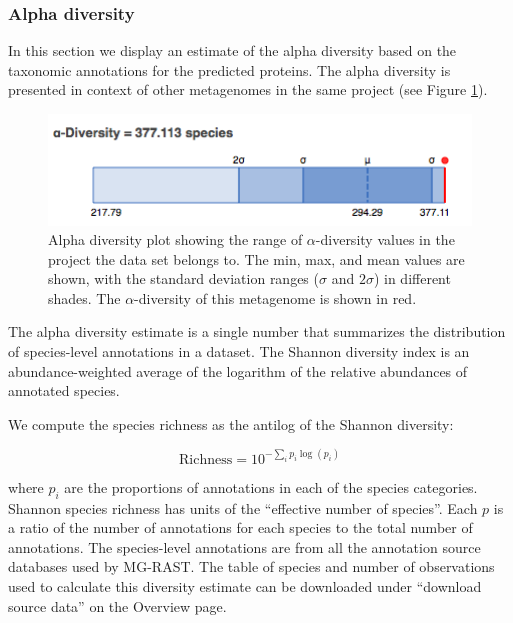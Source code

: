 \documentclass[12pt,fullpage]{report}
\begin{document}
\subsubsection*{Alpha diversity}
In this section we display an estimate of the alpha diversity based on the taxonomic annotations for the predicted proteins. The alpha diversity is presented in context of other metagenomes in the same project (see Figure \ref{fig:alpha-diversity}).

\begin{figure}
\begin{center}
\includegraphics[width=6in]{Images/alpha-diversity.png}
\end{center}
\caption{
Alpha diversity plot showing the range of  {$\alpha$}-diversity values in the project the data set belongs to. The min, max, and mean values are shown, with the standard deviation ranges ($\sigma$ and $2\sigma$) in different shades. The {$\alpha$}-diversity of this metagenome is shown in red.
}
\label{fig:alpha-diversity}
\end{figure}

The alpha diversity estimate is a single number that summarizes the distribution of species-level annotations in a dataset.   The Shannon diversity index is an abundance-weighted average of the logarithm of the relative abundances of annotated species.

We compute the species richness as the antilog of the Shannon diversity:

$$ \textrm{Richness} = 10^{-\sum_i  p_i \log(p_i) }  $$

\noindent
where $p_i$ are the proportions of annotations in each of the species categories.
Shannon species richness
has units of  the ``effective number of species''. Each $p$ is a ratio of the number of annotations for each species to the total number of annotations.
The species-level annotations are from all the annotation source databases used by MG-RAST. The table of species and number of observations used to calculate this diversity estimate can be downloaded under ``download source data'' on the Overview page.
\end{document}
